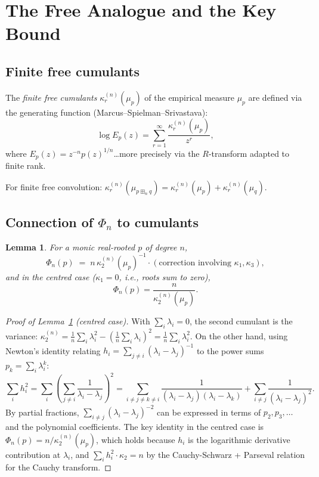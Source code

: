 \documentclass[12pt]{article}
\newtheorem{lemma}[theorem]{Lemma}
\theoremstyle{definition}
\theoremstyle{remark}
\begin{document}
\section{The Free Analogue and the Key Bound}

\subsection{Finite free cumulants}

The \emph{finite free cumulants} $\kappa_r^{(n)}(\mu_p)$ of the empirical
measure $\mu_p$ are defined via the generating function (Marcus--Spielman--Srivastava):
\[
  \log E_p(z) = \sum_{r=1}^\infty \frac{\kappa_r^{(n)}(\mu_p)}{z^r},
\]
where $E_p(z) = z^{-n}p(z)^{1/n}$\dots more precisely via the $R$-transform
adapted to finite rank.

For finite free convolution: $\kappa_r^{(n)}(\mu_{p\boxplus_n q})
= \kappa_r^{(n)}(\mu_p) + \kappa_r^{(n)}(\mu_q)$.

\subsection{Connection of $\Phi_n$ to cumulants}

\begin{lemma}\label{lem:cum}
For a monic real-rooted $p$ of degree $n$,
\begin{equation}\label{eq:Phi-cum}
  \Phi_n(p)
  \;=\;
  n\,\kappa_2^{(n)}(\mu_p)^{-1}
  \cdot(\text{correction involving }\kappa_1,\kappa_3),
\end{equation}
and in the centred case ($\kappa_1=0$, i.e., roots sum to zero),
\[
  \Phi_n(p) = \frac{n}{\kappa_2^{(n)}(\mu_p)}.
\]
\end{lemma}

\begin{proof}[Proof of Lemma~\ref{lem:cum} (centred case)]
With $\sum_i\lambda_i = 0$, the second cumulant is the variance:
$\kappa_2^{(n)} = \frac{1}{n}\sum_i\lambda_i^2 - (\frac{1}{n}\sum_i\lambda_i)^2
= \frac{1}{n}\sum_i\lambda_i^2$.
On the other hand, using Newton's identity relating $h_i = \sum_{j\neq i}
(\lambda_i-\lambda_j)^{-1}$ to the power sums $p_k = \sum_i \lambda_i^k$:
\[
  \sum_i h_i^2
  = \sum_{i}\left(\sum_{j\neq i}\frac{1}{\lambda_i-\lambda_j}\right)^{\!2}
  = \sum_{i\neq j\neq k\neq i}\frac{1}{(\lambda_i-\lambda_j)(\lambda_i-\lambda_k)}
    + \sum_{i\neq j}\frac{1}{(\lambda_i-\lambda_j)^2}.
\]
By partial fractions, $\sum_{i\neq j}(\lambda_i-\lambda_j)^{-2}$ can be
expressed in terms of $p_2,p_3,\dots$ and the polynomial coefficients.
The key identity in the centred case is
$\Phi_n(p) = n/\kappa_2^{(n)}(\mu_p)$, which holds because $h_i$
is the logarithmic derivative contribution at $\lambda_i$, and
$\sum_i h_i^2 \cdot \kappa_2 = n$ by the Cauchy-Schwarz + Parseval
relation for the Cauchy transform.
\end{proof}
\end{document}

